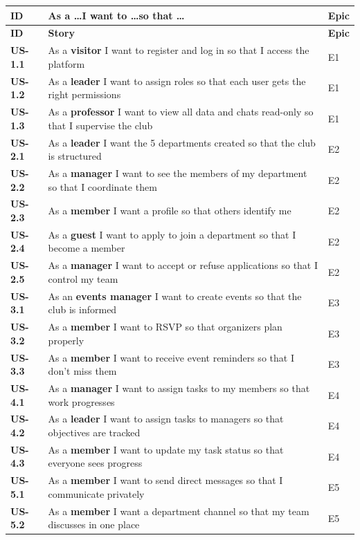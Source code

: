 \documentclass[12pt,a4paper]{report}
\begin{document}
\begin{longtable}{>{\bfseries}p{1.5cm} p{9.6cm} p{2.6cm}}
\toprule
\textbf{ID} & \textbf{As a \dots I want to \dots so that \dots} & \textbf{Epic} \\
\midrule
\endfirsthead
\toprule
\textbf{ID} & \textbf{Story} & \textbf{Epic} \\
\midrule
\endhead
US-1.1 & As a \textbf{visitor} I want to register and log in so that I access the platform & E1 \\
US-1.2 & As a \textbf{leader} I want to assign roles so that each user gets the right permissions & E1 \\
US-1.3 & As a \textbf{professor} I want to view all data and chats read-only so that I supervise the club & E1 \\
US-2.1 & As a \textbf{leader} I want the 5 departments created so that the club is structured & E2 \\
US-2.2 & As a \textbf{manager} I want to see the members of my department so that I coordinate them & E2 \\
US-2.3 & As a \textbf{member} I want a profile so that others identify me & E2 \\
US-2.4 & As a \textbf{guest} I want to apply to join a department so that I become a member & E2 \\
US-2.5 & As a \textbf{manager} I want to accept or refuse applications so that I control my team & E2 \\
US-3.1 & As an \textbf{events manager} I want to create events so that the club is informed & E3 \\
US-3.2 & As a \textbf{member} I want to RSVP so that organizers plan properly & E3 \\
US-3.3 & As a \textbf{member} I want to receive event reminders so that I don't miss them & E3 \\
US-4.1 & As a \textbf{manager} I want to assign tasks to my members so that work progresses & E4 \\
US-4.2 & As a \textbf{leader} I want to assign tasks to managers so that objectives are tracked & E4 \\
US-4.3 & As a \textbf{member} I want to update my task status so that everyone sees progress & E4 \\
US-5.1 & As a \textbf{member} I want to send direct messages so that I communicate privately & E5 \\
US-5.2 & As a \textbf{member} I want a department channel so that my team discusses in one place & E5 \\

\end{longtable}
\end{document}
